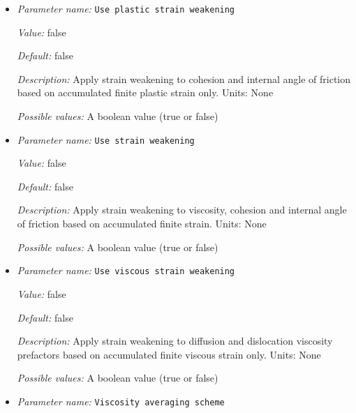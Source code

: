 \begin{itemize}
{\it Value:} false


{\it Default:} false


{\it Description:} Track and use the full finite strain tensor for strain weakening. Units: None


{\it Possible values:} A boolean value (true or false)
\item {\it Parameter name:} {\tt Use plastic strain weakening}
\label{parameters:Material model/Visco Plastic/Use plastic strain weakening}


{\it Value:} false


{\it Default:} false


{\it Description:} Apply strain weakening to cohesion and internal angle of friction based on accumulated finite plastic strain only.  Units: None


{\it Possible values:} A boolean value (true or false)
\item {\it Parameter name:} {\tt Use strain weakening}
\label{parameters:Material model/Visco Plastic/Use strain weakening}


{\it Value:} false


{\it Default:} false


{\it Description:} Apply strain weakening to viscosity, cohesion and internal angle of friction based on accumulated finite strain.  Units: None


{\it Possible values:} A boolean value (true or false)
\item {\it Parameter name:} {\tt Use viscous strain weakening}
\label{parameters:Material model/Visco Plastic/Use viscous strain weakening}


{\it Value:} false


{\it Default:} false


{\it Description:} Apply strain weakening to diffusion and dislocation viscosity prefactors based on accumulated finite viscous strain only.  Units: None


{\it Possible values:} A boolean value (true or false)
\item {\it Parameter name:} {\tt Viscosity averaging scheme}
\label{parameters:Material model/Visco Plastic/Viscosity averaging scheme}



\end{itemize}
